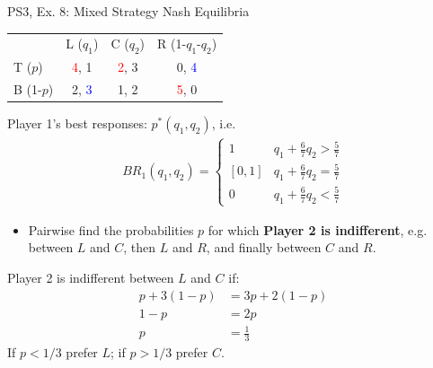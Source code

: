 \begin{frame}{PS3, Ex. 8: Mixed Strategy Nash Equilibria}
  \begin{multicols}{2}
    \begin{table}
      \begin{tabular}{l|c|c|c|}
          \multicolumn{1}{c}{}  & \multicolumn{1}{c}{L ($q_1$)} & \multicolumn{1}{c}{C ($q_2$)} & \multicolumn{1}{c}{R (1-$q_1$-$q_2$)} \\\cline{2-4}
          T ($p$)   & \textcolor{red}{4}, 1 & \textcolor{red}{2}, 3 & 0, \textcolor{blue}{4} \\\cline{2-4}
          B (1-$p$) & 2, \textcolor{blue}{3} & 1, 2 & \textcolor{red}{5}, 0 \\\cline{2-4}
      \end{tabular}
    \end{table}
    Player 1's best responses: $p^{*}(q_1,q_2)$, i.e.
    \begin{align*}
      BR_1(q_1,q_2)=\left\{ \begin{array}{ll}
          1                 & q_1 + \frac{6}{7}q_2 > \frac{5}{7}\\
          \left[0,1\right]  & q_1 + \frac{6}{7}q_2 = \frac{5}{7}\\
          0                 & q_1 + \frac{6}{7}q_2 < \frac{5}{7}
      \end{array}\right.
    \end{align*}
    \begin{itemize}
      \item[4.] Pairwise find the probabilities $p$ for which \textbf{Player 2 is indifferent}, e.g. between $L$ and $C$, then $L$ and $R$, and finally between $C$ and $R$.
    \end{itemize}
  \vfill\null \columnbreak
    Player 2 is indifferent between $L$ and $C$ if:
    \begin{align*}
      p+3(1-p)&= 3p + 2(1-p) \\
      1-p     &= 2p \\
      p       &= \frac{1}{3}
    \end{align*}
    If $p<1/3$ prefer $L$; if $p>1/3$ prefer $C$.\\\medskip
  \vfill\null
  \end{multicols}
\end{frame}
